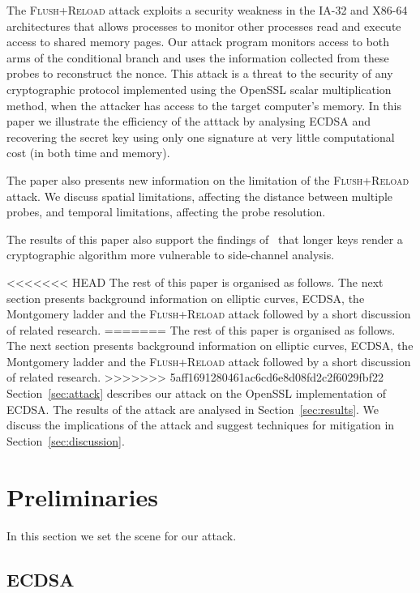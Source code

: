 \documentclass{llncs}
\begin{document}
The \textsc{Flush+Reload} attack exploits a security weakness in the IA-32 and X86-64 architectures that allows processes
to monitor other processes read and execute access to shared memory pages.
Our attack program monitors access to both arms of the conditional branch and uses the information
collected from these probes to reconstruct the nonce. This attack is a threat to the security of any cryptographic protocol implemented using the OpenSSL scalar multiplication method, when the attacker has access to the target computer's memory. In this paper we illustrate the efficiency of the atttack by analysing ECDSA and recovering the secret key using only one signature at very little computational cost (in both time and memory).

The paper also presents new information on the limitation of the \textsc{Flush+Reload} attack.
We discuss spatial limitations, affecting the distance between multiple probes, and 
temporal limitations, affecting the probe resolution.

The results of this paper also support the findings of~\cite{walter04longer} that longer keys render a cryptographic algorithm more vulnerable to side-channel analysis.


<<<<<<< HEAD
The rest of this paper is organised as follows. The next section presents background information on elliptic curves, ECDSA, the Montgomery ladder and the \textsc{Flush+Reload} attack followed by a short discussion of related research.%
=======
The rest of this paper is organised as follows. 
The next section presents background information on elliptic curves, ECDSA, 
the Montgomery ladder and the \textsc{Flush+Reload} attack followed by a short discussion of related research.
>>>>>>> 5aff1691280461ac6cd6e8d08fd2c2f6029fbf22
Section~\ref{sec:attack} describes our attack on the OpenSSL implementation of ECDSA.
The results of the attack are analysed in Section~\ref{sec:results}.
We discuss the implications of the attack and suggest techniques for mitigation in Section~\ref{sec:discussion}.

\section{Preliminaries}\label{sec:background}
In this section we set the scene for our attack.

\subsection{ECDSA}\label{sub:ecdsa}
\end{document}
